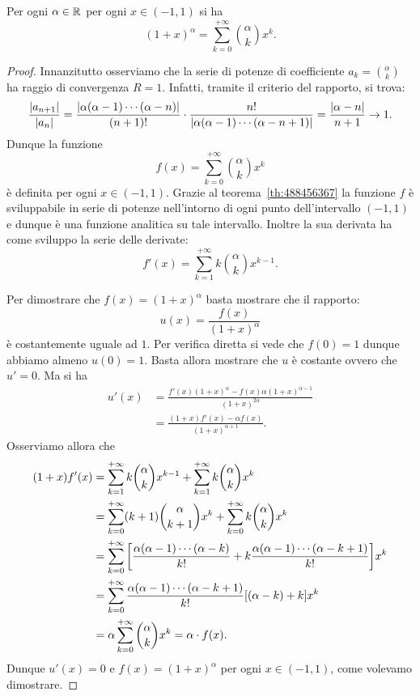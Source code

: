 \begin{theorem}
\label{th:serie_binomiale}%
%
Per ogni $\alpha\in {\mathbb R}$ per ogni $x\in (-1,1)$ si ha
\[
  (1+x)^{\alpha}  = \sum_{k=0}^{+\infty} {\alpha \choose k} x^k.
\]
\end{theorem}
%
\begin{proof}
Innanzitutto osserviamo che la serie di potenze di coefficiente
$a_k = {\alpha \choose k}$ ha raggio di convergenza $R=1$.
Infatti, tramite il criterio del rapporto, si trova:
\[
  \frac{{\left|a_{n+1}\right|}}{{\left|a_n\right|}}
  = \frac{{\left|\alpha (\alpha-1) \cdots (\alpha-n)\right|}}{(n+1)!}
  \cdot \frac{n!}{{\left|\alpha(\alpha-1) \cdots (\alpha-n+1)\right|}}
  = \frac{{\left|\alpha-n\right|}}{n+1} \to 1.
\]
Dunque la funzione
\[
 f(x) = \sum_{k=0}^{+\infty} {\alpha \choose k} x^k
\]
è definita per ogni $x\in(-1,1)$.
Grazie al teorema~\ref{th:488456367} la funzione $f$ è sviluppabile
in serie di potenze nell'intorno di ogni punto dell'intervallo $(-1,1)$
e dunque è una funzione analitica su tale intervallo. Inoltre la sua
derivata ha come sviluppo la serie delle derivate:
\[
  f'(x) = \sum_{k=1}^{+\infty} k {\alpha \choose k} x^{k-1}.
\]

Per dimostrare che $f(x) = (1+x)^\alpha$ basta mostrare che il rapporto:
\[
  u(x) = \frac{f(x)}{(1+x)^\alpha}
\]
è costantemente uguale ad $1$. Per verifica diretta si vede che $f(0)=1$
dunque abbiamo almeno $u(0) = 1$. Basta allora mostrare che $u$ è costante
ovvero che $u'=0$. Ma si ha
\begin{align*}
  u'(x)
  &= \frac{f'(x) (1+x)^\alpha - f(x) \alpha (1+x)^{\alpha-1}}{(1+x)^{2\alpha}} \\
  &= \frac{(1+x) f'(x) - \alpha f(x)}{(1+x)^{\alpha+1}}.
\end{align*}
Osserviamo allora che
\begin{align*}
(1+x)f'(x)
&= \sum_{k=1}^{+\infty} k{\alpha \choose k} x^{k-1}
+ \sum_{k=1}^{+\infty} k{\alpha \choose k} x^{k}\\
&= \sum_{k=0}^{+\infty} (k+1){\alpha \choose k+1} x^k
+ \sum_{k=0}^{+\infty} k {\alpha \choose k} x^k \\
&= \sum_{k=0}^{+\infty} {\left[ \frac{\alpha(\alpha-1) \cdots (\alpha-k)}{k!}
 + k \frac{\alpha(\alpha-1)\cdots(\alpha-k+1)}{k!} \right]} x^k \\
 &= \sum_{k=0}^{+\infty} \frac{\alpha(\alpha-1)\cdots(\alpha-k+1)}{k!}{\left[ (\alpha-k)+k \right]} x^k\\
 &= \alpha \sum_{k=0}^{+\infty} {\alpha \choose k} x^k = \alpha \cdot f(x).
\end{align*}
Dunque $u'(x)=0$ e $f(x) = (1+x)^\alpha$ per ogni $x\in(-1,1)$, come
volevamo dimostrare.
\end{proof}

